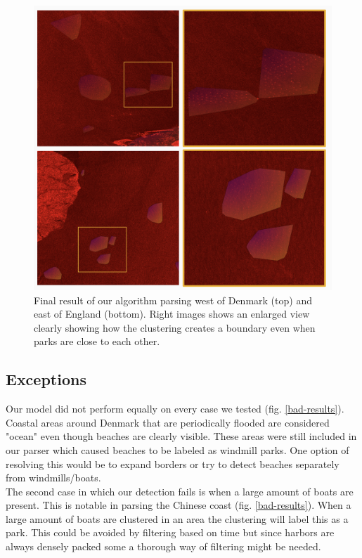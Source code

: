 \begin{figure}[ht]
\begin{center}
\centerline{\includegraphics[width=\columnwidth]{images/good-results.png}}
\caption{Final result of our algorithm parsing west of Denmark (top) and east of England (bottom). Right images shows an enlarged view clearly showing how the clustering creates a boundary even when parks are close to each other.}
\label{good-results}
\end{center}
\end{figure}

\subsection{Exceptions}

Our model did not perform equally on every case we tested (fig. \ref{bad-results}). Coastal areas around Denmark that are periodically flooded are considered "ocean" even though beaches are clearly visible. These areas were still included in our parser which caused beaches to be labeled as windmill parks. One option of resolving this would be to expand borders or try to detect beaches separately from windmills/boats.\\

The second case in which our detection fails is when a large amount of boats are present. This is notable in parsing the Chinese coast (fig. \ref{bad-results}). When a large amount of boats are clustered in an area the clustering will label this as a park. This could be avoided by filtering based on time but since harbors are always densely packed some a thorough way of filtering might be needed.

